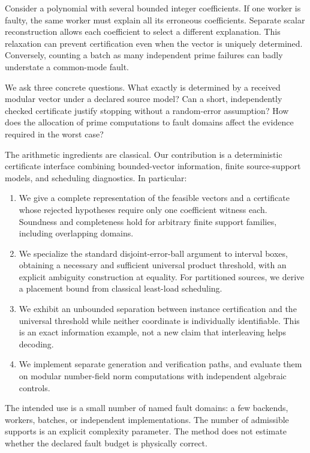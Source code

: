 \documentclass[11pt]{article}
\theoremstyle{definition}\newtheorem{definition}[theorem]{Definition}
\begin{document}
Consider a polynomial with several bounded integer coefficients. If one worker is faulty, the same worker must explain all its erroneous coefficients. Separate scalar reconstruction allows each coefficient to select a different explanation. This relaxation can prevent certification even when the vector is uniquely determined. Conversely, counting a batch as many independent prime failures can badly understate a common-mode fault.

We ask three concrete questions. What exactly is determined by a received modular vector under a declared source model? Can a short, independently checked certificate justify stopping without a random-error assumption? How does the allocation of prime computations to fault domains affect the evidence required in the worst case?

The arithmetic ingredients are classical. Our contribution is a deterministic certificate interface combining bounded-vector information, finite source-support models, and scheduling diagnostics. In particular:
\begin{enumerate}
\item We give a complete representation of the feasible vectors and a certificate whose rejected hypotheses require only one coefficient witness each. Soundness and completeness hold for arbitrary finite support families, including overlapping domains.
\item We specialize the standard disjoint-error-ball argument to interval boxes, obtaining a necessary and sufficient universal product threshold, with an explicit ambiguity construction at equality. For partitioned sources, we derive a placement bound from classical least-load scheduling.
\item We exhibit an unbounded separation between instance certification and the universal threshold while neither coordinate is individually identifiable. This is an exact information example, not a new claim that interleaving helps decoding.
\item We implement separate generation and verification paths, and evaluate them on modular number-field norm computations with independent algebraic controls.
\end{enumerate}
The intended use is a small number of named fault domains: a few backends, workers, batches, or independent implementations. The number of admissible supports is an explicit complexity parameter. The method does not estimate whether the declared fault budget is physically correct.
\end{document}
